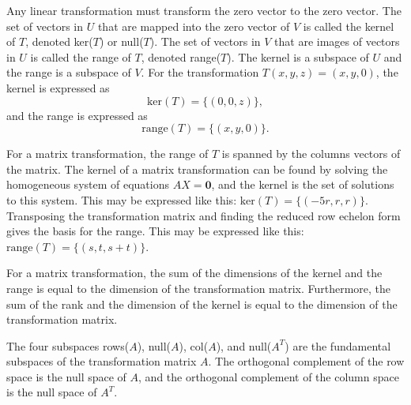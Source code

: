 \documentclass{article}
\begin{document}
    Any linear transformation must transform the zero vector to the zero vector. 
    The set of vectors in $U$ that are mapped into the zero vector of $V$ is called the kernel of $T$,
    denoted ker($T$) or null($T$).
    The set of vectors in $V$ that are images of vectors in $U$ is called the range of $T$,
    denoted range($T$). 
    The kernel is a subspace of $U$ and the range is a subspace of $V$.
    For the transformation $T(x,y,z) = (x,y,0)$,
    the kernel is expressed as 
    \[
    \text{ker}(T) = \{(0,0,z)\},
    \]
    and the range is expressed as
    \[
    \text{range}(T) = \{(x,y,0)\}.
    \]

    For a matrix transformation, the range of $T$ is spanned by the columns vectors of the matrix.
    The kernel of a matrix transformation can be found by solving the homogeneous system of equations $AX = \mathbf{0}$,
    and the kernel is the set of solutions to this system. 
    This may be expressed like this: $\text{ker}(T) = \{(-5r, r, r)\}$.
    Transposing the transformation matrix and finding the reduced row echelon form gives the basis for the range. 
    This may be expressed like this: $\text{range}(T) = \{(s, t, s + t)\}$.

    For a matrix transformation,
    the sum of the dimensions of the kernel and the range is equal to the dimension of the transformation matrix.
    Furthermore, the sum of the rank and the dimension of the kernel is equal to the dimension of the transformation matrix.

    The four subspaces rows($A$), null($A$), col($A$), and null($A^T$) 
    are the fundamental subspaces of the transformation matrix $A$.
    The orthogonal complement of the row space is the null space of $A$,
    and the orthogonal complement of the column space is the null space of $A^T$.
    
\end{document}
